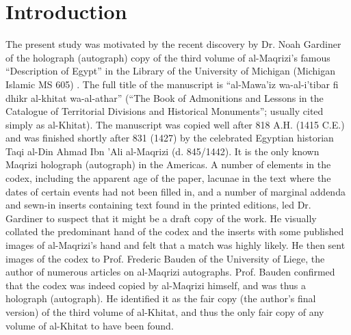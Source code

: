 \documentclass[conference,a4paper,twocolumn]{IEEEtran}
\begin{document}

%
\IEEEpeerreviewmaketitle


\section{Introduction}
\label{sec:introduction}
The present study was motivated by the recent discovery by Dr. Noah Gardiner of the holograph (autograph) copy of the third volume of al-Maqrizi's famous ``Description of Egypt'' in the Library of the University of Michigan (Michigan Islamic MS 605) \cite{Noah}. The full title of the manuscript is ``al-Mawa'iz wa-al-i'tibar fi dhikr al-khitat wa-al-athar'' (``The Book of Admonitions and Lessons in the Catalogue of Territorial Divisions and Historical Monuments''; usually cited simply as al-Khitat). The manuscript was copied well after 818 A.H. (1415 C.E.) and was finished shortly after 831 (1427) by the celebrated Egyptian historian Taqi al-Din Ahmad Ibn 'Ali al-Maqrizi (d. 845/1442). It is the only known Maqrizi holograph (autograph) in the Americas. A number of elements in the codex, including the apparent age of the paper, lacunae in the text where the dates of certain events had not been filled in, and a number of marginal addenda and sewn-in inserts containing text found in the printed editions, led Dr. Gardiner to suspect that it might be a draft copy of the work. He visually collated the predominant hand of the codex and the inserts with some published images of al-Maqrizi’s hand and felt that a match was highly likely. He then sent images of the codex to Prof. Frederic Bauden of the University of Liege, the author of numerous articles on al-Maqrizi autographs. Prof. Bauden confirmed that the codex was indeed copied by al-Maqrizi himself, and was thus a holograph (autograph). He identified it as the fair copy (the author’s final version) of the third volume of al-Khitat, and thus the only fair copy of any volume of al-Khitat to have been found.
\end{document}
